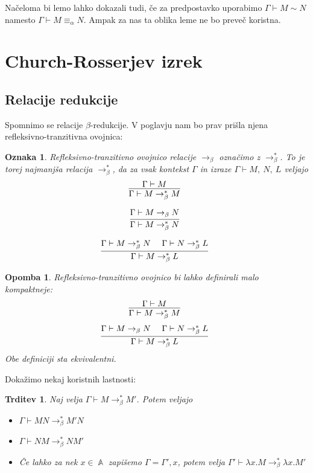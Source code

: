 \documentclass{article}
\DeclareMathOperator{\Atoms}{\mathds{A}}
\newcommand{\inference}[3][]{\infer[#1]{#3}{#2}}
\newtheorem{trditev}{Trditev}
\newtheorem{opomba}{Opomba}
\newtheorem{oznaka}{Oznaka}
\begin{document}
Načeloma bi lemo lahko dokazali tudi, če za predpostavko uporabimo \(\Gamma \vdash M \sim N\) namesto \(\Gamma \vdash M \equiv_\alpha N\). Ampak za nas ta oblika leme ne bo preveč koristna.


\newpage
\section{Church-Rosserjev izrek}

\subsection{Relacije redukcije}

Spomnimo se relacije \(\beta\)-redukcije. V poglavju nam bo prav prišla njena refleksivno-tranzitivna ovojnica:
\begin{oznaka}
    Refleksivno-tranzitivno ovojnico relacije \(\rightarrow_\beta\) označimo z \(\rightarrow_\beta^*\). To je torej najmanjša relacija \(\rightarrow_\beta^*\), da za vsak kontekst \(\Gamma\) in izraze \(\Gamma \vdash M,\ N,\ L\) veljajo
    \[
        \inference{\Gamma \vdash M}{\Gamma \vdash M \rightarrow_\beta^* M}
    \]
    
    \[
        \inference{\Gamma \vdash M \rightarrow_\beta N}{\Gamma \vdash M \rightarrow_\beta^* N}
    \]
    
    \[
        \inference{\Gamma \vdash M \rightarrow_\beta^* N\, \quad\, \Gamma \vdash N \rightarrow_\beta^* L}{\Gamma \vdash M \rightarrow_\beta^* L}
    \]
\end{oznaka}

\begin{opomba}
    Refleksivno-tranzitivno ovojnico bi lahko definirali malo kompaktneje:
    \[
        \inference{\Gamma \vdash M}{\Gamma \vdash M \rightarrow_\beta^* M}
    \]
    \[
        \inference{\Gamma \vdash M \rightarrow_\beta N\, \quad\, \Gamma \vdash N \rightarrow_\beta^* L}{\Gamma \vdash M \rightarrow_\beta^* L}
    \]
    Obe definiciji sta ekvivalentni.
\end{opomba}

Dokažimo nekaj koristnih lastnosti:

\begin{trditev}
    Naj velja \(\Gamma \vdash M \rightarrow_\beta^* M'\). Potem veljajo
    \begin{itemize}
        \item \(\Gamma \vdash MN \rightarrow_\beta^* M'N\)
        \item \(\Gamma \vdash NM \rightarrow_\beta^* NM'\)
        \item Če lahko za nek \(x \in \Atoms\) zapišemo \(\Gamma = \Gamma', x\), potem velja \(\Gamma' \vdash \lambda x. M \rightarrow_\beta^* \lambda x. M'\)
    \end{itemize}
\end{trditev}
\end{document}
